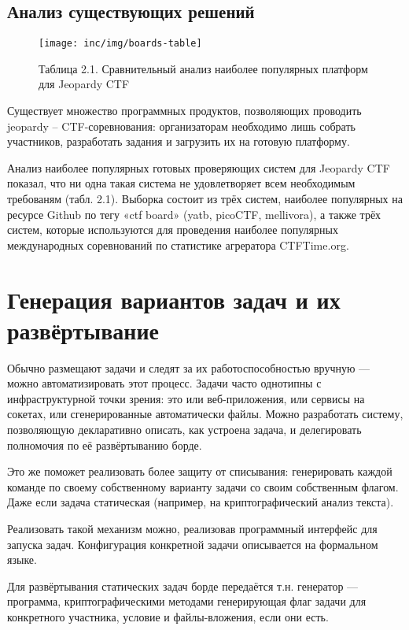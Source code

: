 \subsection{Анализ существующих решений}

\begin{figure}
  \centering
  \texttt{[image: inc/img/boards-table]}
  \caption{Таблица 2.1. Сравнительный анализ наиболее популярных платформ для Jeopardy CTF}
  \label{fig:jeopardy}
\end{figure}

Существует множество программных продуктов, позволяющих проводить jeopardy -- CTF-соревнования: организаторам необходимо лишь собрать участников, разработать задания и загрузить их на готовую платформу.

Анализ наиболее популярных готовых проверяющих систем для Jeopardy CTF показал, что ни одна такая система не удовлетворяет всем необходимым требованям (табл. 2.1). Выборка состоит из трёх систем, наиболее популярных на ресурсе Github\cite{GithubCTFTag} по тегу «ctf board» (yatb, picoCTF, mellivora), а также трёх систем, которые используются для проведения наиболее популярных международных соревнований по статистике агрератора CTFTime.org\cite{CTFTime}.

\section{Генерация вариантов задач и их развёртывание}

Обычно размещают задачи и следят за их работоспособностью вручную — можно автоматизировать этот процесс. Задачи часто однотипны с инфраструктурной точки зрения: это или веб-приложения, или сервисы на сокетах, или сгенерированные автоматически файлы. Можно разработать систему, позволяющую декларативно описать, как устроена задача, и делегировать полномочия по её развёртыванию борде.

Это же поможет реализовать более защиту от списывания: генерировать каждой команде по своему собственному варианту задачи со своим собственным флагом. Даже если задача статическая (например, на криптографический анализ текста).

Реализовать такой механизм можно, реализовав программный интерфейс для запуска задач. Конфигурация конкретной задачи описывается на формальном языке.

Для развёртывания статических задач борде передаётся т.н. генератор — программа, криптографическими методами генерирующая флаг задачи для конкретного участника, условие и файлы-вложения, если они есть.

